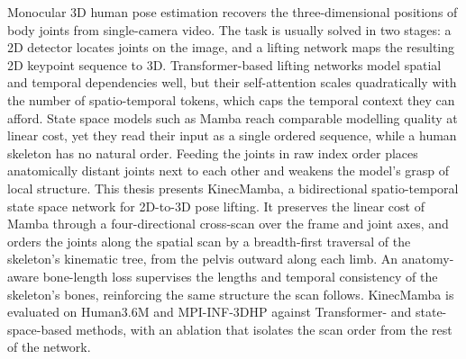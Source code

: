 Monocular 3D human pose estimation recovers the three-dimensional positions of body
joints from single-camera video. The task is usually solved in two stages: a 2D
detector locates joints on the image, and a lifting network maps the resulting 2D
keypoint sequence to 3D. Transformer-based lifting networks model spatial and
temporal dependencies well, but their self-attention scales quadratically with the
number of spatio-temporal tokens, which caps the temporal context they can afford.
State space models such as Mamba reach comparable modelling quality at linear cost,
yet they read their input as a single ordered sequence, while a human skeleton has no
natural order. Feeding the joints in raw index order places anatomically distant
joints next to each other and weakens the model's grasp of local structure. This
thesis presents KinecMamba, a bidirectional spatio-temporal state space network for
2D-to-3D pose lifting. It preserves the linear cost of Mamba through a
four-directional cross-scan over the frame and joint axes, and orders the joints
along the spatial scan by a breadth-first traversal of the skeleton's kinematic tree,
from the pelvis outward along each limb. An anatomy-aware bone-length loss supervises
the lengths and temporal consistency of the skeleton's bones, reinforcing the same
structure the scan follows. KinecMamba is evaluated on Human3.6M and MPI-INF-3DHP
against Transformer- and state-space-based methods, with an ablation that isolates the
scan order from the rest of the network.

\setlength{\parskip}{0pt}


